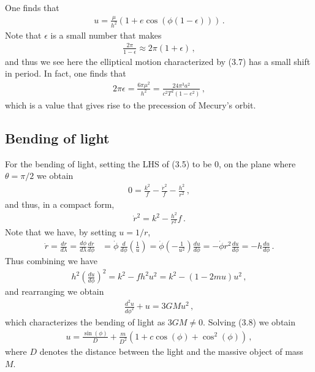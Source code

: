 \documentclass[11pt, onesided]{book}
\theoremstyle{break}
\theoremstyle{break}
\begin{document}
One finds that 
\begin{align}
u = \frac{\mu}{h^2}\left( 1 + e\cos(\phi (1-\epsilon))\right)\,.
\end{align}
Note that $\epsilon$ is a small number that makes
\begin{align*}
\frac{2\pi}{1-\epsilon} \approx 2\pi (1+\epsilon)\,,
\end{align*}
and thus we see here the elliptical motion characterized by (3.7) has a small shift in period. In fact, one finds that
\begin{align*}
2\pi \epsilon = \frac{6\pi \mu^2}{h^2} = \frac{24\pi^3 a^2}{c^2 T^2 (1-e^2)}\,,
\end{align*}
which is a value that gives rise to the precession of Mecury's orbit. \\


\subsection{Bending of light}
For the bending of light, setting the LHS of (3.5) to be $0$, on the plane where $\theta = \pi/2$ we obtain
\begin{align*}
0 = \frac{k^2}{f} - \frac{\dot{r}^2}{f} - \frac{h^2}{r^2}\,,
\end{align*}
and thus, in a compact form,
\begin{align*}
\dot{r}^2 = k^2 - \frac{h^2}{r^2}f\,.
\end{align*}
Note that we have, by setting $u = 1/r$, 
\begin{align*}
\dot{r} = \frac{dr}{d\lambda} = \frac{d\phi}{d\lambda}\frac{dr}{d\phi} 
&= \dot{\phi}\, \frac{d}{d\phi}\left( \frac{1}{u}\right)
=\dot{\phi}\left(- \frac{1}{u^2}\right)  \frac{du}{d\phi} = -\dot{\phi}r^2 \frac{du}{d\phi} = -h \frac{du}{d\phi}\,.
\end{align*}
Thus combining we have
\begin{align*}
h^2 \left( \frac{du}{d\phi}\right)^2 = k^2 - fh^2 u^2 = k^2- (1-2m u)u^2\,,
\end{align*}
and rearranging we obtain
\begin{align}
\frac{d^2 u}{d\phi^2} + u = 3GM u^2\,,
\end{align}
which characterizes the bending of light as $3GM \neq 0$. Solving (3.8) we obtain
\begin{align*}
u = \frac{\sin(\phi)}{D} + \frac{m}{D^2}\left( 1 + c\cos(\phi)  + \cos^2(\phi)\right)\,,
\end{align*}
where $D$ denotes the distance between the light and the massive object of mass $M$.\\
\end{document}
